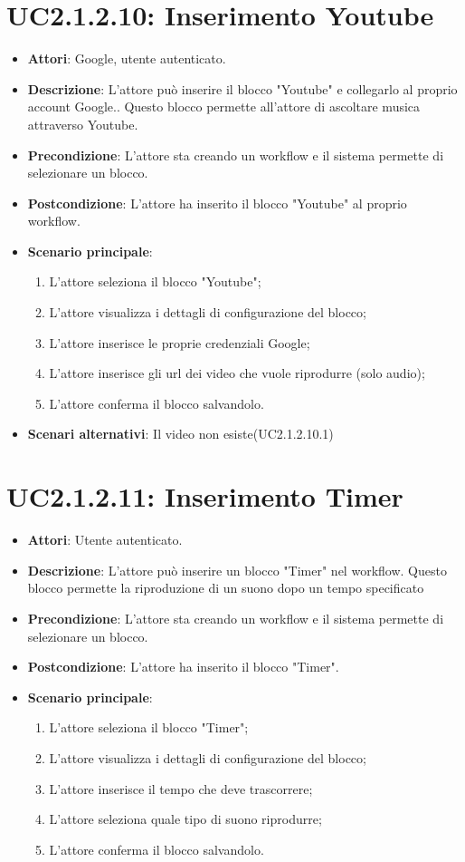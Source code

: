 \section{UC2.1.2.10: Inserimento Youtube}
\label{UC2.1.2.10}
\begin{itemize}
	\item \textbf{Attori}: Google, utente autenticato.
	\item \textbf{Descrizione}: L'attore può inserire il blocco "Youtube" e collegarlo al proprio account Google.. Questo blocco permette all'attore di ascoltare musica attraverso Youtube.
	\item \textbf{Precondizione}: L'attore sta creando un workflow e il sistema permette di selezionare un blocco.
	\item \textbf{Postcondizione}: L'attore ha inserito il blocco "Youtube" al proprio workflow.
	\item \textbf{Scenario principale}:
	\begin{enumerate} \item L'attore seleziona il blocco "Youtube";  \item L'attore visualizza i dettagli di configurazione del blocco; \item  L'attore inserisce le proprie credenziali Google;  \item  L'attore inserisce gli url dei video che vuole riprodurre (solo audio); \item L'attore conferma il blocco salvandolo.\end{enumerate}
	\item \textbf{Scenari alternativi}:
	Il video non esiste(UC2.1.2.10.1)
\end{itemize}


\section{UC2.1.2.11: Inserimento Timer}
\label{UC2.1.2.11}
\begin{itemize}
	\item \textbf{Attori}: Utente autenticato.
	\item \textbf{Descrizione}: L'attore può inserire un blocco "Timer" nel workflow. Questo blocco permette la riproduzione di un suono dopo un tempo specificato
	\item \textbf{Precondizione}: L'attore sta creando un workflow e il sistema permette di selezionare un blocco.
	\item \textbf{Postcondizione}: L'attore ha inserito il blocco "Timer".
	\item \textbf{Scenario principale}:
	\begin{enumerate} \item L'attore seleziona il blocco "Timer"; \item L'attore visualizza i dettagli di configurazione del blocco; \item  L'attore inserisce il tempo che deve trascorrere;  \item  L'attore seleziona quale tipo di suono riprodurre; \item L'attore conferma il blocco salvandolo.\end{enumerate}
\end{itemize}

